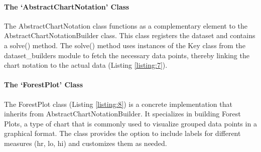 \paragraph{The `AbstractChartNotation'
Class}\label{the-abstractchartnotation-class}

The AbstractChartNotation class functions as a complementary element to
the AbstractChartNotationBuilder class. This class registers the dataset
and contains a solve() method. The solve() method uses instances of the
Key class from the dataset\_builders module to fetch the necessary data
points, thereby linking the chart notation to the actual data (Listing
\ref{listing:7}).


\paragraph{The `ForestPlot' Class}\label{the-forestplot-class}


The ForestPlot class (Listing \ref{listing:8}) is a concrete implementation that
inherits from AbstractChartNotationBuilder. It specializes in building
Forest Plots, a type of chart that is commonly used to visualize grouped
data points in a graphical format. The class provides the option to
include labels for different measures (hr, lo, hi) and customizes them
as needed.

